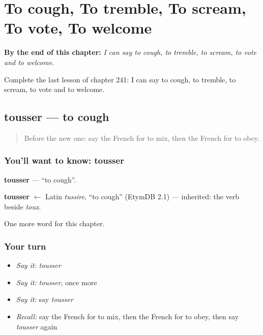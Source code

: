 
\chapter{To cough, To tremble, To scream, To vote, To welcome}
\label{ch:fr-to-cough-to-tremble-to-scream-to-vote-to-welcome}

\begin{chapteropening}
\textbf{By the end of this chapter:} \emph{I can say to cough, to tremble, to scream, to vote and to welcome.}

Complete the last lesson of chapter 241: I can say to cough, to tremble, to scream, to vote and to welcome.
\end{chapteropening}

\section[tousser]{tousser — to cough}

\label{lesson:FR-C241-tousser}



\begin{quote}
Before the new one: say the French for to mix, then the French for to obey.
\end{quote}

\subsection*{You'll want to know: tousser}
\textbf{tousser} — \textquotedblleft{}to cough\textquotedblright{}.

\begin{cousinweb}
\textbf{tousser} $\leftarrow$ Latin \emph{tussire}, \textquotedblleft{}to cough\textquotedblright{} (EtymDB 2.1) — inherited: the verb beside \emph{toux}.
\end{cousinweb}

\begin{grammarlens}[title={What you've built}]
One more word for this chapter.
\end{grammarlens}

\subsection*{Your turn}
\begin{itemize}
\raggedright
  \item \emph{Say it:} \emph{tousser}
  \item \emph{Say it:} \emph{tousser}, once more
  \item \emph{Say it:} say \emph{tousser}
  \item \emph{Recall:} say the French for to mix, then the French for to obey, then say \emph{tousser} again
\end{itemize}

